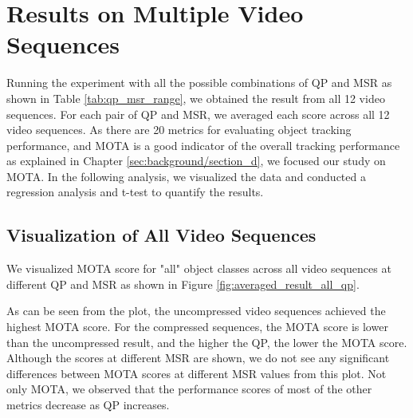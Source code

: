 \section{Results on Multiple Video Sequences}
\label{sec:results/section_a}

Running the experiment with all the possible combinations of QP and MSR as shown in Table \ref{tab:qp_msr_range}, we obtained the result from all 12 video sequences. For each pair of QP and MSR, we averaged each score across all 12 video sequences. As there are 20 metrics for evaluating object tracking performance, and MOTA is a good indicator of the overall tracking performance as explained in Chapter \ref{sec:background/section_d}, we focused our study on MOTA. In the following analysis, we visualized the data and conducted a regression analysis and t-test to quantify the results. 


\subsection{Visualization of All Video Sequences}
\label{subsec:/results/section_a/visualization}
We visualized MOTA score for "all" object classes across all video sequences at different QP and MSR as shown in Figure \ref{fig:averaged_result_all_qp}.

As can be seen from the plot, the uncompressed video sequences achieved the highest MOTA score. For the compressed sequences, the MOTA score is lower than the uncompressed result, and the higher the QP, the lower the MOTA score. Although the scores at different MSR are shown, we do not see any significant differences between MOTA scores at different MSR values from this plot. Not only MOTA, we observed that the performance scores of most of the other metrics decrease as QP increases.


